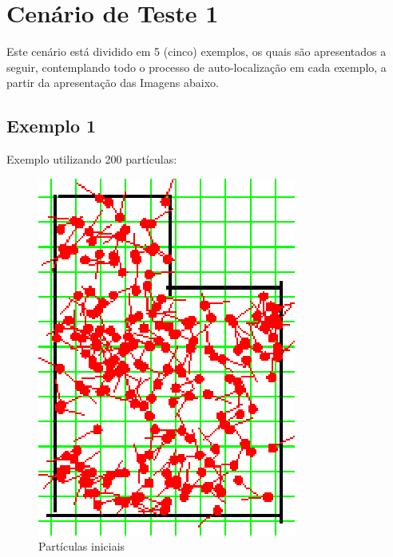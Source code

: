 \section{Cenário de Teste 1}

Este cenário está dividido em 5 (cinco) exemplos, os quais são apresentados a seguir, contemplando todo o processo de auto-localização
em cada exemplo, a partir da apresentação das Imagens abaixo.

\subsection{Exemplo 1}

Exemplo utilizando 200 partículas:

\begin{figure}[H]
  \centering
  \includegraphics[scale=1]{figuras/cen1_ex1/1.eps}
  \caption[Partículas Iniciais]{Partículas iniciais}
  \label{img:cen1_ex1_1}
\end{figure}

